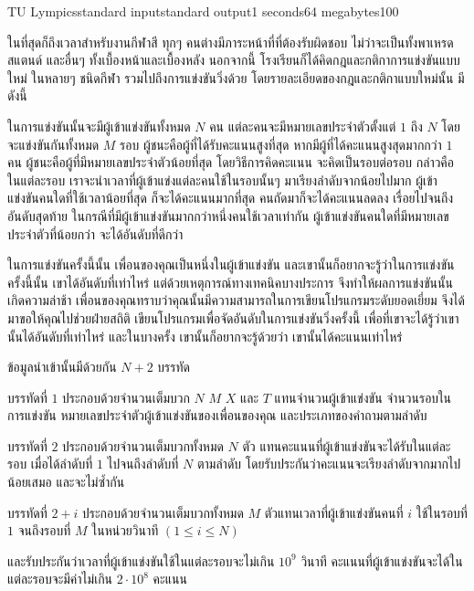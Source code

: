 \documentclass[11pt,a4paper]{article}
\begin{document}
\begin{problem}{TU Lympics}{standard input}{standard output}{1 seconds}{64 megabytes}{100}

ในที่สุดก็ถึงเวลาสำหรับงานกีฬาสี ทุกๆ คนต่างมีภาระหน้าที่ที่ต้องรับผิดชอบ ไม่ว่าจะเป็นทั้งพาเหรด สแตนด์ และอื่นๆ ทั้งเบื้องหน้าและเบื้องหลัง นอกจากนี้ โรงเรียนก็ได้คิดกฎและกติกาการแข่งขันแบบใหม่ ในหลายๆ ชนิดกีฬา รวมไปถึงการแข่งขันวิ่งด้วย โดยรายละเอียดของกฎและกติกาแบบใหม่นั้น มีดังนี้

ในการแข่งขันนั้นจะมีผู้เข้าแข่งขันทั้งหมด $N$ คน แต่ละคนจะมีหมายเลขประจำตัวตั้งแต่ $1$ ถึง $N$ โดยจะแข่งขันกันทั้งหมด $M$ รอบ ผู้ชนะคือผู้ที่ได้รับคะแนนสูงที่สุด หากมีผู้ที่ได้คะแนนสูงสุดมากกว่า $1$ คน ผู้ชนะคือผู้ที่มีหมายเลขประจำตัวน้อยที่สุด โดยวิธีการคิดคะแนน จะคิดเป็นรอบต่อรอบ กล่าวคือ ในแต่ละรอบ เราจะนำเวลาที่ผู้เข้าแข่งแต่ละคนใช้ในรอบนั้นๆ มาเรียงลำดับจากน้อยไปมาก ผู้เข้าแข่งขันคนใดที่ใช้เวลาน้อยที่สุด ก็จะได้คะแนนมากที่สุด คนถัดมาก็จะได้คะแนนลดลง เรื่อยไปจนถึงอันดับสุดท้าย ในกรณีที่มีผู้เข้าแข่งขันมากกว่าหนึ่งคนใช้เวลาเท่ากัน ผู้เข้าแข่งขันคนใดที่มีหมายเลขประจำตัวที่น้อยกว่า จะได้อันดับที่ดีกว่า

ในการแข่งขันครั้งนี้นั้น เพื่อนของคุณเป็นหนึ่งในผู้เข้าแข่งขัน และเขานั้นก็อยากจะรู้ว่าในการแข่งขันครั้งนี้นั้น เขาได้อันดับที่เท่าไหร่ แต่ด้วยเหตุการณ์ทางเทคนิคบางประการ จึงทำให้ผลการแข่งขันนั้นเกิดความล่าช้า เพื่อนของคุณทราบว่าคุณนั้นมีความสามารถในการเขียนโปรแกรมระดับยอดเยี่ยม จึงได้มาขอให้คุณไปช่วยฝ่ายสถิติ เขียนโปรแกรมเพื่อจัดอันดับในการแข่งขันวิ่งครั้งนี้ เพื่อที่เขาจะได้รู้ว่าเขานั้นได้อันดับที่เท่าไหร่ และในบางครั้ง เขานั้นก็อยากจะรู้ด้วยว่า เขานั้นได้คะแนนเท่าไหร่ 

\InputFile
ข้อมูลนำเข้านั้นมีด้วยกัน $N+2$ บรรทัด 

บรรทัดที่ $1$ ประกอบด้วยจำนวนเต็มบวก $N$ $M$ $X$ และ $T$ แทนจำนวนผู้เข้าแข่งขัน จำนวนรอบในการแข่งขัน หมายเลขประจำตัวผู้เข้าแข่งขันของเพื่อนของคุณ และประเภทของคำถามตามลำดับ
	
บรรทัดที่ $2$ ประกอบด้วยจำนวนเต็มบวกทั้งหมด $N$ ตัว แทนคะแนนที่ผู้เข้าแข่งขันจะได้รับในแต่ละรอบ เมื่อได้ลำดับที่ $1$ ไปจนถึงลำดับที่ $N$ ตามลำดับ โดยรับประกันว่าคะแนนจะเรียงลำดับจากมากไปน้อยเสมอ และจะไม่ซ้ำกัน

บรรทัดที่ $2+i$ ประกอบด้วยจำนวนเต็มบวกทั้งหมด $M$ ตัวแทนเวลาที่ผู้เข้าแข่งขันคนที่ $i$ ใช้ในรอบที่ $1$ จนถึงรอบที่ $M$ ในหน่วยวินาที  $(1 \leq i \leq N )$ 

และรับประกันว่าเวลาที่ผู้เข้าแข่งขันใช้ในแต่ละรอบจะไม่เกิน $10^9$ วินาที คะแนนที่ผู้เข้าแข่งขันจะได้ในแต่ละรอบจะมีค่าไม่เกิน $2 \cdot 10^8$ คะแนน


\end{problem}
\end{document}
